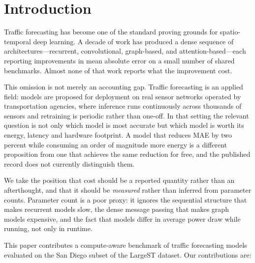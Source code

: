 \documentclass[manuscript,screen,review]{acmart}
\begin{document}


\maketitle

\section{Introduction}
Traffic forecasting has become one of the standard proving grounds for
spatio-temporal deep learning. A decade of work has produced a dense
sequence of architectures---recurrent, convolutional, graph-based, and
attention-based---each reporting improvements in mean absolute error on a
small number of shared benchmarks. Almost none of that work reports what
the improvement cost.

This omission is not merely an accounting gap. Traffic forecasting is an
applied field: models are proposed for deployment on real sensor networks
operated by transportation agencies, where inference runs continuously
across thousands of sensors and retraining is periodic rather than
one-off. In that setting the relevant question is not only which model is
most accurate but which model is worth its energy, latency and hardware
footprint. A model that reduces MAE by two percent while consuming an
order of magnitude more energy is a different proposition from one that
achieves the same reduction for free, and the published record does not
currently distinguish them.

We take the position that cost should be a reported quantity rather than
an afterthought, and that it should be \emph{measured} rather than
inferred from parameter counts. Parameter count is a poor proxy: it
ignores the sequential structure that makes recurrent models slow, the
dense message passing that makes graph models expensive, and the fact that
models differ in average power draw while running, not only in runtime.

This paper contributes a compute-aware benchmark of traffic forecasting
models evaluated on the San Diego subset of the LargeST dataset. Our
contributions are:
\end{document}
